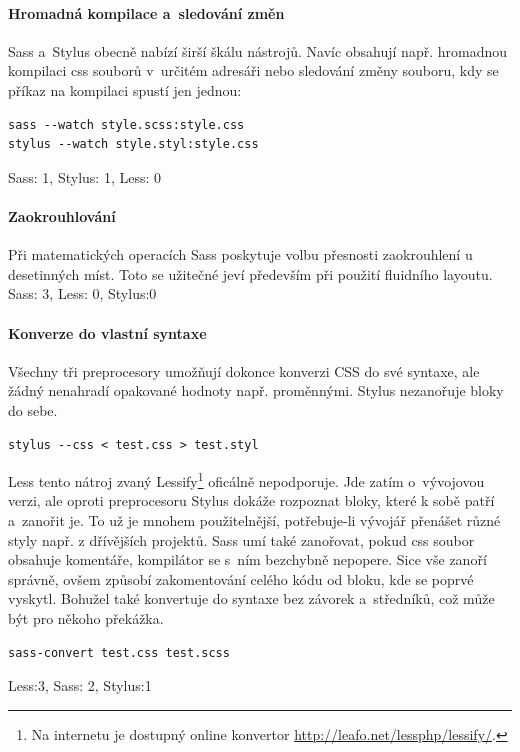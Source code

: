 \documentclass[thesis=B,czech]{FITthesis}[2012/06/26]
\begin{document}
\paragraph{Hromadná kompilace a~sledování změn}

 Sass a~Stylus obecně nabízí širší škálu nástrojů. Navíc obsahují např. hromadnou kompilaci css souborů v~určitém adresáři nebo sledování změny souboru, kdy se příkaz na kompilaci spustí jen jednou:
\scriptsize
\begin{verbatim}
sass --watch style.scss:style.css
stylus --watch style.styl:style.css
\end{verbatim}
\normalsize
Sass: 1, Stylus: 1, Less: 0

\paragraph{Zaokrouhlování}

 Při matematických operacích Sass poskytuje volbu přesnosti zaokrouhlení u desetinných míst. Toto se užitečné jeví především při použití fluidního layoutu.
Sass: 3, Less: 0, Stylus:0
\paragraph{Konverze do vlastní syntaxe}

 Všechny tři preprocesory umožňují dokonce konverzi CSS do své syntaxe, ale žádný nenahradí opakované hodnoty např. proměnnými. Stylus nezanořuje bloky do sebe.
\scriptsize
\begin{verbatim}
stylus --css < test.css > test.styl
\end{verbatim}
\normalsize
Less tento nátroj zvaný Lessify\footnote{Na internetu je dostupný online konvertor \url{http://leafo.net/lessphp/lessify/}.} oficálně nepodporuje. Jde zatím o~vývojovou verzi, ale oproti preprocesoru Stylus dokáže rozpoznat bloky, které k sobě patří a~zanořit je. To už je mnohem použitelnější, potřebuje-li vývojář přenášet různé styly např. z dřívějších projektů. 
Sass umí také zanořovat, pokud css soubor obsahuje komentáře, kompilátor se s~ním bezchybně nepopere. Sice vše zanoří správně, ovšem způsobí zakomentování celého kódu od bloku, kde se poprvé vyskytl. Bohužel také konvertuje do syntaxe bez závorek a~středníků, což může být pro někoho překážka. 

\scriptsize
\begin{verbatim}
sass-convert test.css test.scss
\end{verbatim}
\normalsize
Less:3, Sass: 2, Stylus:1
\end{document}
